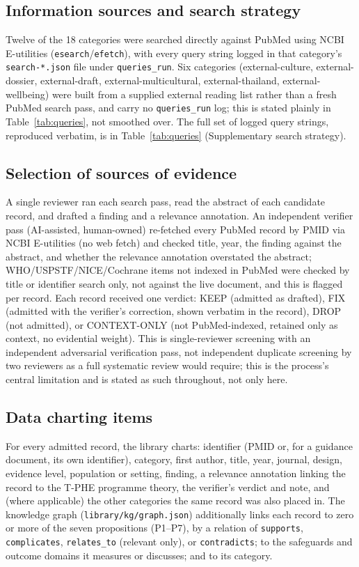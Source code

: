 \documentclass[11pt]{article}
\newcommand{\tphe}{T\mbox{-}PHE}
\begin{document}
\subsection{Information sources and search strategy}
Twelve of the 18 categories were searched directly against PubMed using NCBI E-utilities
(\texttt{esearch}/\texttt{efetch}), with every query string logged in that category's
\texttt{search-*.json} file under \texttt{queries\_run}. Six categories (external-culture,
external-dossier, external-draft, external-multicultural, external-thailand, external-wellbeing)
were built from a supplied external reading list rather than a fresh PubMed search pass, and carry
no \texttt{queries\_run} log; this is stated plainly in Table~\ref{tab:queries}, not smoothed over.
The full set of logged query strings, reproduced verbatim, is in Table~\ref{tab:queries}
(Supplementary search strategy).



\subsection{Selection of sources of evidence}
A single reviewer ran each search pass, read the abstract of each candidate record, and drafted a
finding and a relevance annotation. An independent verifier pass (AI-assisted, human-owned)
re-fetched every PubMed record by PMID via NCBI E-utilities (no web fetch) and checked title,
year, the finding against the abstract, and whether the relevance annotation overstated the
abstract; WHO/USPSTF/NICE/Cochrane items not indexed in PubMed were checked by title or
identifier search only, not against the live document, and this is flagged per record. Each
record received one verdict: KEEP (admitted as drafted), FIX (admitted with the verifier's
correction, shown verbatim in the record), DROP (not admitted), or CONTEXT-ONLY (not
PubMed-indexed, retained only as context, no evidential weight). This is single-reviewer
screening with an independent adversarial verification pass, not independent duplicate
screening by two reviewers as a full systematic review would require; this is the process's
central limitation and is stated as such throughout, not only here.

\subsection{Data charting items}
For every admitted record, the library charts: identifier (PMID or, for a guidance document, its
own identifier), category, first author, title, year, journal, design, evidence level, population
or setting, finding, a relevance annotation linking the record to the \tphe{} programme theory,
the verifier's verdict and note, and (where applicable) the other categories the same record was
also placed in. The knowledge graph (\texttt{library/kg/graph.json}) additionally links each
record to zero or more of the seven propositions (P1--P7), by a relation of \texttt{supports},
\texttt{complicates}, \texttt{relates\_to} (relevant only), or \texttt{contradicts}; to the
safeguards and outcome domains it measures or discusses; and to its category.
\end{document}
